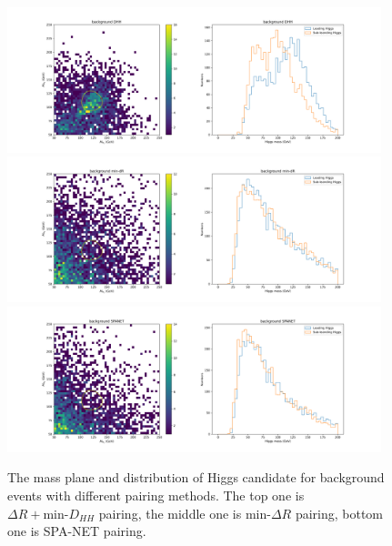 \documentclass[12pt]{article}
\begin{document}
	\begin{figure}[htpb]
		\centering
		\includegraphics[width=0.97\textwidth]{Higgs_mass_old_DHH_4b.png}
		\includegraphics[width=0.97\textwidth]{Higgs_mass_old_mindR_4b.png}
		\includegraphics[width=0.97\textwidth]{Higgs_mass_old_SPANET_4b.png}
		\caption{The mass plane and distribution of Higgs candidate for background events with different pairing methods. The top one is $\Delta R + \text{min-}D_{HH}$ pairing, the middle one is $\text{min-}\Delta R$ pairing, bottom one is SPA-NET pairing.}
		\label{fig:Higgs_mass_old_background}
	\end{figure}
\end{document}
